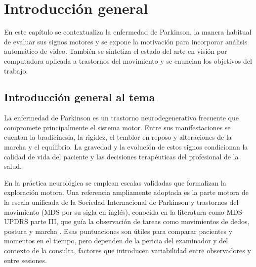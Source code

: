 
\chapter{Introducción general} %

\label{Chapter1} %
\label{IntroGeneral}

En este capítulo se contextualiza la enfermedad de Parkinson, la manera habitual de evaluar sus signos motores y se expone la motivación para incorporar análisis automático de video. También se sintetiza el estado del arte en visión por computadora aplicada a trastornos del movimiento y se enuncian los objetivos del trabajo.


\newcommand{\keyword}[1]{\textbf{#1}}
\newcommand{\tabhead}[1]{\textbf{#1}}
\newcommand{\code}[1]{\texttt{#1}}
\newcommand{\file}[1]{\texttt{\bfseries#1}}
\newcommand{\option}[1]{\texttt{\itshape#1}}
\newcommand{\grados}{$^{\circ}$}


\section{Introducción general al tema}

La enfermedad de Parkinson es un trastorno neurodegenerativo frecuente que compromete principalmente el sistema motor. Entre sus manifestaciones se cuentan la bradicinesia, la rigidez, el temblor en reposo y alteraciones de la marcha y el equilibrio. La gravedad y la evolución de estos signos condicionan la calidad de vida del paciente y las decisiones terapéuticas del profesional de la salud.

En la práctica neurológica se emplean escalas validadas que formalizan la exploración motora. Una referencia ampliamente adoptada es la parte motora de la escala unificada de la Sociedad Internacional de Parkinson y trastornos del movimiento (MDS por su sigla en inglés), conocida en la literatura como MDS-UPDRS parte III, que guía la observación de tareas como movimientos de dedos, postura y marcha \citep{sibley2021video}. Esas puntuaciones son útiles para comparar pacientes y momentos en el tiempo, pero dependen de la pericia del examinador y del contexto de la consulta, factores que introducen variabilidad entre observadores y entre sesiones.

